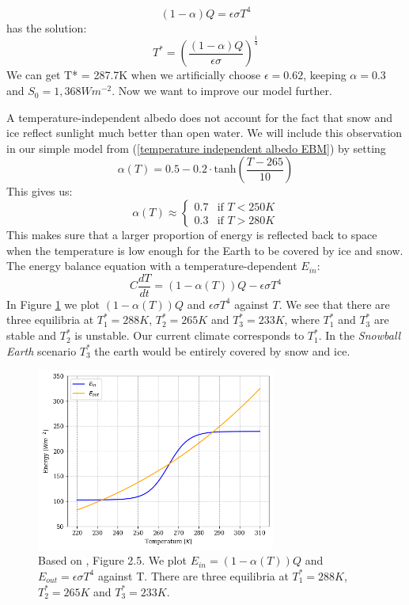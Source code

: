 \documentclass[%
thesis=student,%
coverpage=false,%
titlepage=false,%
headmarks=true, %
english,%
font=libertine, %
math=newpxtx, %
BCOR=5mm,%
coverBCOR=11mm%
]{tumbook}
\begin{document}
\begin{equation}
    (1-\alpha)Q = \epsilon \sigma T^4
\end{equation}
has the solution: 
\begin{equation}
    T^* = (\frac{(1-\alpha)Q}{\epsilon\sigma})^\frac{1}{4}
\end{equation}
We can get T* = 287.7K when we artificially choose $\epsilon = 0.62$, keeping $\alpha = 0.3$ and $S_{0} = 1,368 Wm^{-2}$. 
Now we want to improve our model further. 

A temperature-independent albedo does not account for the fact that snow and ice reflect sunlight much better than open water. We will include this observation in our simple model from (\ref{temperature independent albedo EBM}) by setting 
\begin{equation}
    \alpha (T) = 0.5 - 0.2 \cdot \text{tanh}(\frac{T - 265}{10})
\end{equation}
This gives us: 
\[
\alpha(T) \approx
\begin{cases}
0.7 & \text{if } T < 250K \\
0.3 & \text{if } T > 280K
\end{cases}
\]
This makes sure that a larger proportion of energy is reflected back to space when the temperature is low enough for the Earth to be covered by ice and snow.
The energy balance equation with a temperature-dependent $E_{in}$: 
\begin{equation}
 C\frac{dT}{dt} = (1-\alpha(T))Q - \epsilon\sigma T^4
 \label{simple EBM}
\end{equation}
 In Figure \ref{fig:Energy vs Temperature} we plot $(1-\alpha(T))Q$ and $\epsilon\sigma T^4$ against $T$. We see that there are three equilibria at $T_{1}^* = 288K$, $T_{2}^* = 265K$ and $T_{3}^* = 233K$, where $T_{1}^*$ and $T_{3}^*$ are stable and $T_{2}^*$ is unstable. Our current climate corresponds to $T_{1}^*$. In the \textit{Snowball Earth} scenario $T_{3}^*$ the earth would be entirely covered by snow and ice. 

\begin{figure}
    \centering
    \includegraphics[width=0.7\textwidth]{bachelor-thesis/figures/se_multiple_equilibria.png}
    \caption{Based on \cite{Kaper:2013}, Figure 2.5. We plot $E_{in} = (1-\alpha(T))Q$ and $E_{out} = \epsilon\sigma T^4$ against T. There are three equilibria at $T_{1}^* = 288K$, $T_{2}^* = 265K$ and $T_{3}^* = 233K$.}
    \label{fig:Energy vs Temperature}
\end{figure}
\end{document}
